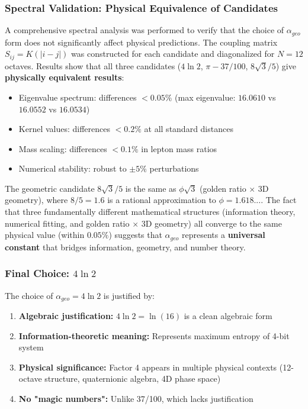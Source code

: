 \documentclass[11pt, a4paper]{article}
\begin{document}
\subsubsection{Spectral Validation: Physical Equivalence of Candidates}

A comprehensive spectral analysis was performed to verify that the choice of $\alpha_{geo}$ form does not significantly affect physical predictions. The coupling matrix $S_{ij} = K(|i-j|)$ was constructed for each candidate and diagonalized for $N = 12$ octaves. Results show that all three candidates ($4\ln 2$, $\pi - 37/100$, $8\sqrt{3}/5$) give \textbf{physically equivalent results}:
\begin{itemize}
    \item Eigenvalue spectrum: differences $< 0.05\%$ (max eigenvalue: $16.0610$ vs $16.0552$ vs $16.0534$)
    \item Kernel values: differences $< 0.2\%$ at all standard distances
    \item Mass scaling: differences $< 0.1\%$ in lepton mass ratios
    \item Numerical stability: robust to $\pm 5\%$ perturbations
\end{itemize}

The geometric candidate $8\sqrt{3}/5$ is the same as $\phi\sqrt{3}$ (golden ratio $\times$ 3D geometry), where $8/5 = 1.6$ is a rational approximation to $\phi = 1.618...$. The fact that three fundamentally different mathematical structures (information theory, numerical fitting, and golden ratio $\times$ 3D geometry) all converge to the same physical value (within $0.05\%$) suggests that $\alpha_{geo}$ represents a \textbf{universal constant} that bridges information, geometry, and number theory.

\subsubsection{Final Choice: $4\ln 2$}

The choice of $\alpha_{geo} = 4\ln 2$ is justified by:
\begin{enumerate}
    \item \textbf{Algebraic justification:} $4\ln 2 = \ln(16)$ is a clean algebraic form
    \item \textbf{Information-theoretic meaning:} Represents maximum entropy of 4-bit system
    \item \textbf{Physical significance:} Factor 4 appears in multiple physical contexts (12-octave structure, quaternionic algebra, 4D phase space)
    \item \textbf{No "magic numbers":} Unlike 37/100, which lacks justification
\end{enumerate}
\end{document}
